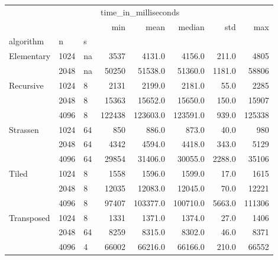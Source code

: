 \begin{tabular}{lllrrrrr}
\toprule
           &      &   & \multicolumn{5}{l}{time\_in\_milliseconds} \\
           &      &   &                  min &      mean &    median &     std &     max \\
algorithm & n & s &                      &           &           &         &         \\
\midrule
Elementary & 1024 & na &                 3537 &    4131.0 &    4156.0 &   211.0 &    4805 \\
           & 2048 & na &                50250 &   51538.0 &   51360.0 &  1181.0 &   58806 \\
Recursive & 1024 & 8 &                 2131 &    2199.0 &    2181.0 &    55.0 &    2285 \\
           & 2048 & 8 &                15363 &   15652.0 &   15650.0 &   150.0 &   15907 \\
           & 4096 & 8 &               122438 &  123603.0 &  123591.0 &   939.0 &  125338 \\
Strassen & 1024 & 64 &                  850 &     886.0 &     873.0 &    40.0 &     980 \\
           & 2048 & 64 &                 4342 &    4594.0 &    4418.0 &   343.0 &    5129 \\
           & 4096 & 64 &                29854 &   31406.0 &   30055.0 &  2288.0 &   35106 \\
Tiled & 1024 & 8 &                 1558 &    1596.0 &    1599.0 &    17.0 &    1615 \\
           & 2048 & 8 &                12035 &   12083.0 &   12045.0 &    70.0 &   12221 \\
           & 4096 & 8 &                97407 &  103377.0 &  100710.0 &  5663.0 &  111306 \\
Transposed & 1024 & 8 &                 1331 &    1371.0 &    1374.0 &    27.0 &    1406 \\
           & 2048 & 64 &                 8259 &    8315.0 &    8302.0 &    46.0 &    8371 \\
           & 4096 & 4 &                66002 &   66216.0 &   66166.0 &   210.0 &   66552 \\
\bottomrule
\end{tabular}
